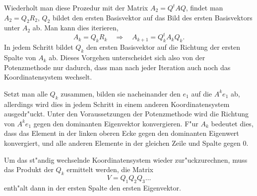 Wiederholt man diese Prozedur mit
der Matrix $A_2=Q^tAQ$, findet man $A_2=Q_2R_2$, 
$Q_2$  bildet den ersten Basisvektor auf das Bild  des ersten
Basisvektors unter $A_2$ ab. Man kann dies iterieren,
\[
A_k=Q_kR_k\quad\Rightarrow\quad
A_{k+1}=Q_k^tA_kQ_k.
\]
In jedem Schritt bildet $Q_k$ den ersten Basisvektor auf die Richtung
der ersten Spalte von $A_k$ ab. Dieses Vorgehen unterscheidet sich
also von der Potenzmethode nur dadurch, dass man nach jeder Iteration
auch noch das Koordinatensystem wechselt.

Setzt man alle $Q_k$ zusammen, bilden
sie nacheinander den $e_1$ auf die $A^ke_1$ ab, allerdings wird
dies in jedem Schritt in einem anderen Koordinatensystem ausgedr"uckt.
Unter den Voraussetzungen der Potenzmethode wird die Richtung von
$A^ke_1$ gegen den dominanten Eigenvektor konvergieren. F"ur $A_k$
bedeutet dies,
dass das Element in der linken oberen Ecke gegen den dominanten Eigenwert
konvergiert, und alle anderen Elemente in der gleichen Zeile und Spalte
gegen $0$.

Um das st"andig wechselnde Koordinatensystem wieder zur"uckzurechnen,
muss das Produkt der $Q_k$ ermittelt werden,  die Matrix
\[
V=Q_1Q_2Q_3\dots
\]
enth"alt dann in der ersten Spalte den ersten Eigenvektor.

